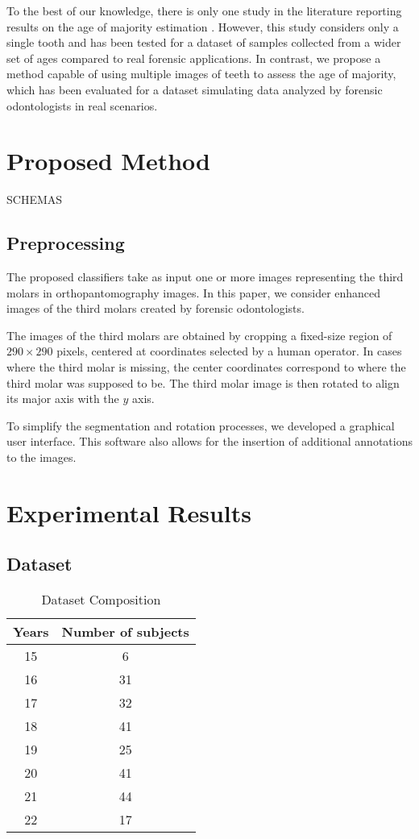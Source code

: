 \documentclass[conference]{IEEEtran}
\begin{document}
To the best of our knowledge, there is only one study in the literature reporting results on the age of majority estimation \cite{PMID33661340}. However, this study considers only a single tooth and has been tested for a dataset of samples collected from a wider set of ages compared to real forensic applications. In contrast, we propose a method capable of using multiple images of teeth to assess the age of majority, which has been evaluated for a dataset simulating data analyzed by forensic odontologists in real scenarios.

\section{Proposed Method}
SCHEMAS
\subsection{Preprocessing}
The proposed classifiers take as input one or more images representing the third molars in orthopantomography images. In this paper, we consider enhanced images of the third molars created by forensic odontologists.

The images of the third molars are obtained by cropping a fixed-size region of $290 \times 290$ pixels, centered at coordinates selected by a human operator. In cases where the third molar is missing, the center coordinates correspond to where the third molar was supposed to be. The third molar image is then rotated to align its major axis with the $y$ axis.

To simplify the segmentation and rotation processes, we developed a graphical user interface. This software also allows for the insertion of additional annotations to the images.

\section{Experimental Results}
\subsection{Dataset}

\begin{table}[t]
	\centering
	\caption{Dataset Composition}
	\begin{tabular}{cc}
		\hline
		\hline
		Years & Number of subjects \\
		\hline
		15    & 6 \\
		16    & 31 \\
		17    & 32 \\
		18    & 41 \\
		19    & 25 \\
		20    & 41 \\
		21    & 44 \\
		22    & 17 \\
		\hline
		\hline
	\end{tabular}%
	\label{tabDB}%
\end{table}%
\end{document}
